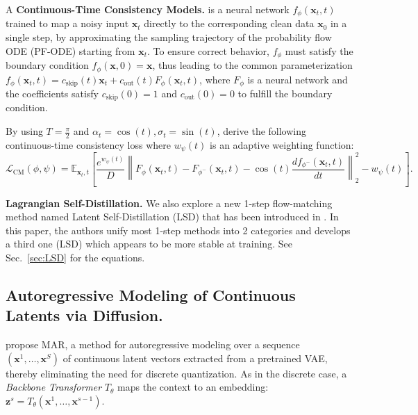 A \textbf{Continuous-Time Consistency Models.} \citep{consistency} is a neural network $f_\phi(\mathbf{x}_t, t)$ trained to map a noisy input $\mathbf{x}_t$ directly to the corresponding clean data $\mathbf{x}_0$ in a single step, by approximating the sampling trajectory of the probability flow ODE (PF-ODE) starting from $\mathbf{x}_t$. To ensure correct behavior, $f_\phi$ must satisfy the boundary condition $f_\phi(\mathbf{x}, 0) = \mathbf{x}$, thus leading to the common parameterization $f_\phi(\mathbf{x}_t, t) = c_{\text{skip}}(t) \mathbf{x}_t + c_{\text{out}}(t) F_\phi(\mathbf{x}_t, t)$, where $F_\phi$ is a neural network and the coefficients satisfy $c_{\text{skip}}(0) = 1$ and $c_{\text{out}}(0) = 0$ to fulfill the boundary condition.


By using $T=\frac{\pi}{2}$ and $\alpha_t=\cos(t), \sigma_t=\sin(t)$, \citet{continuous_consistency} derive the following continuous-time consistency loss where $w_\psi(t)$ is an adaptive weighting function:
\begin{equation}
\label{eq:objective_ctcm}
    \mathcal{L}_{\text{CM}}(\phi,\psi) = \mathbb{E}_{\mathbf{x}_t,t}\left[\!
    \frac{e^{w_\psi(t)}}{D}\left\|
        F_\phi\left(\mathbf{x}_t,t\right) - F_{\phi^-}\left(\mathbf{x}_t,t\right)
        - \cos(t)\frac{df_{\phi^-}(\mathbf{x}_t,t)}{d t}
    \right\|_2^2 - w_\psi(t)
    \right].
\end{equation}

\textbf{Lagrangian Self-Distillation.} We also explore a new 1-step flow-matching method named Latent Self-Distillation (LSD) that has been introduced in \citet{lsd}. In this paper, the authors unify most 1-step methods into 2 categories and develops a third one (LSD) which appears to be more stable at training. See Sec.~\ref{sec:LSD} for the equations. 

\subsection{Autoregressive Modeling of Continuous Latents via Diffusion.}
\citet{autoreg_image_quant} propose MAR, a method for autoregressive modeling over a sequence $\left( \mathbf{x}^1, \ldots, \mathbf{x}^S\right)$ of continuous latent vectors extracted from a pretrained VAE, thereby eliminating the need for discrete quantization. As in the discrete case, a \textit{Backbone Transformer} \( T_\theta \) maps the context to an embedding: $\mathbf{z}^s = T_\theta(\mathbf{x}^1, \ldots, \mathbf{x}^{s-1})$.

